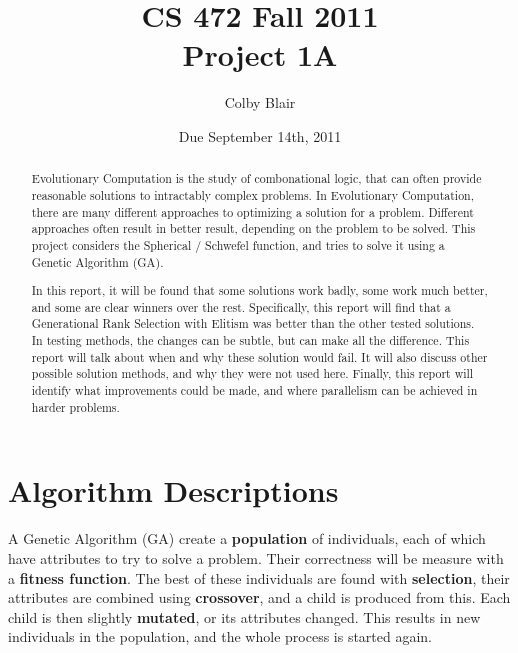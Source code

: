 \documentclass[12pt]{article}
\title{CS 472 Fall 2011 \\
     Project 1A}
\author{Colby Blair}
\date{Due September 14th, 2011}
\begin{document}
\maketitle

\begin{abstract}
Evolutionary Computation is the study of combonational logic, that can often provide reasonable solutions to
intractably complex problems. In Evolutionary Computation, there are many different approaches to optimizing a solution for a problem. Different approaches often result in better result, depending on the problem to be solved. This project considers the Spherical / Schwefel function, and tries to solve it using a Genetic Algorithm (GA).

In this report, it will be found that some solutions work badly, some work much better, and some are clear winners over the rest. Specifically, this report will find that a Generational Rank Selection with Elitism was better than the other tested solutions. In testing methods, the changes can be subtle, but can make all the difference. This report will talk about when and why these solution would fail. It will also discuss other possible solution methods, and why they were not used here. Finally, this report will identify what 
improvements could be made, and where parallelism can be achieved in harder problems.
\end{abstract}
\pagebreak

\part{Algorithm Descriptions}
\label{part:alg_desc}

A Genetic Algorithm (GA) create a \textbf{population} of individuals, each of which have attributes to try to solve a problem. Their correctness will be measure with a \textbf{fitness function}. The best of these individuals are found with \textbf{selection}, their attributes are combined using \textbf{crossover}, and a child is produced from this. Each child is then slightly \textbf{mutated}, or its attributes changed. This results in new individuals in the population, and the whole process is started again.
\end{document}
